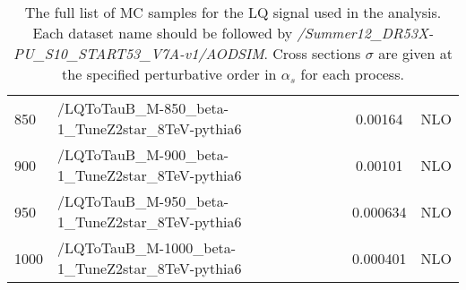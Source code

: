 {\begin{landscape}
\begin{table}[hbt]
\begin{center}
{\begin{tabular}{|l|l|c|l|}
850  & /LQToTauB\_M-850\_beta-1\_TuneZ2star\_8TeV-pythia6  & 0.00164  & NLO \\
900  & /LQToTauB\_M-900\_beta-1\_TuneZ2star\_8TeV-pythia6  & 0.00101  & NLO \\
950  & /LQToTauB\_M-950\_beta-1\_TuneZ2star\_8TeV-pythia6  & 0.000634 & NLO \\
1000 & /LQToTauB\_M-1000\_beta-1\_TuneZ2star\_8TeV-pythia6 & 0.000401 & NLO \\
\hline
\end{tabular}
}
\caption{The full list of MC samples for the LQ signal used in the analysis. Each dataset name should be followed by \emph{/Summer12\_DR53X-PU\_S10\_START53\_V7A-v1/AODSIM}. Cross sections $\sigma$ are given at the specified perturbative order in $\alpha_{s}$ for each process.}
\label{tab:mcsamplesLQ}
\end{center}
\end{table}
\end{landscape}
}

